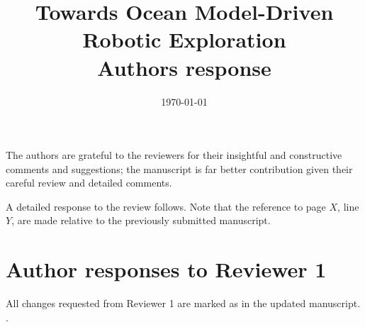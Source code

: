\documentclass[a4paper]{article}
\begin{document}
\title{Towards Ocean Model-Driven Robotic Exploration
  \\\vspace{5mm}
 Authors response 
  \\\vspace{5mm}
}


\date{\today}

\maketitle

The authors are grateful to the reviewers for their insightful and
constructive comments and suggestions; the manuscript is far better
contribution given their careful review and detailed comments.

A detailed response to the review follows. Note that the reference to
page $X$, line $Y$, are made relative to the previously submitted
manuscript.

\section*{Author responses to Reviewer 1}
All changes requested from Reviewer 1 are marked as 
in the updated manuscript. \setcounter{reviewer}{1}.



\setcounter{reviewer}{1}
\end{document}
